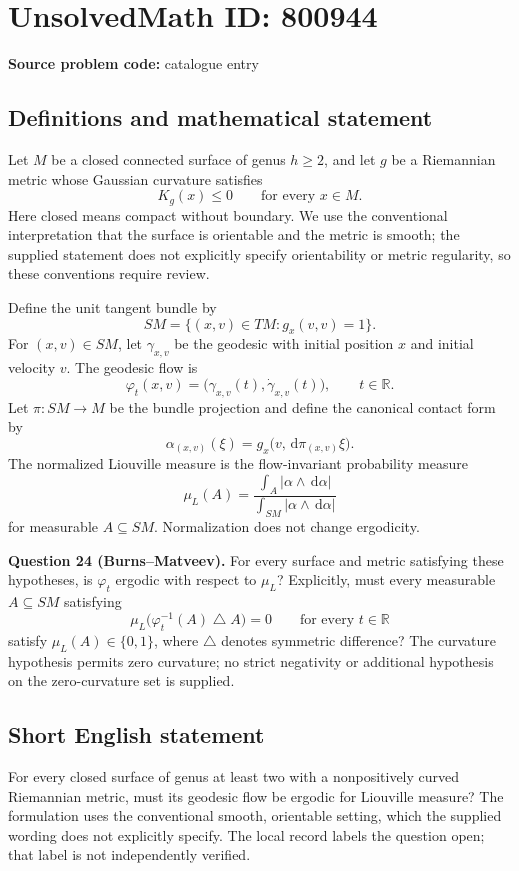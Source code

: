 \documentclass[11pt]{article}
\newcommand{\R}{\mathbb{R}}
\newcommand{\dd}{\,\mathrm{d}}
\begin{document}
\section*{UnsolvedMath ID: 800944}
\textbf{Source problem code:} catalogue entry
\subsection{Definitions and mathematical statement}
Let \(M\) be a closed connected surface of genus \(h\geq 2\), and let \(g\) be a Riemannian metric whose Gaussian curvature satisfies
\[
K_g(x)\leq 0\qquad\text{for every }x\in M.
\]
Here closed means compact without boundary. We use the conventional interpretation that the surface is orientable and the metric is smooth; the supplied statement does not explicitly specify orientability or metric regularity, so these conventions require review.

Define the unit tangent bundle by
\[
SM=\{(x,v)\in TM:g_x(v,v)=1\}.
\]
For \((x,v)\in SM\), let \(\gamma_{x,v}\) be the geodesic with initial position \(x\) and initial velocity \(v\). The geodesic flow is
\[
\varphi_t(x,v)=\bigl(\gamma_{x,v}(t),\dot\gamma_{x,v}(t)\bigr),\qquad t\in\R.
\]
Let \(\pi:SM\to M\) be the bundle projection and define the canonical contact form by
\[
\alpha_{(x,v)}(\xi)=g_x\bigl(v,\dd\pi_{(x,v)}\xi\bigr).
\]
The normalized Liouville measure is the flow-invariant probability measure
\[
\mu_L(A)=\frac{\displaystyle\int_A|\alpha\wedge\dd\alpha|}{\displaystyle\int_{SM}|\alpha\wedge\dd\alpha|}
\]
for measurable \(A\subseteq SM\). Normalization does not change ergodicity.

\textbf{Question 24 (Burns--Matveev).} For every surface and metric satisfying these hypotheses, is \(\varphi_t\) ergodic with respect to \(\mu_L\)? Explicitly, must every measurable \(A\subseteq SM\) satisfying
\[
\mu_L\bigl(\varphi_t^{-1}(A)\mathbin{\triangle}A\bigr)=0\qquad\text{for every }t\in\R
\]
satisfy \(\mu_L(A)\in\{0,1\}\), where \(\triangle\) denotes symmetric difference? The curvature hypothesis permits zero curvature; no strict negativity or additional hypothesis on the zero-curvature set is supplied.
\subsection{Short English statement}
For every closed surface of genus at least two with a nonpositively curved Riemannian metric, must its geodesic flow be ergodic for Liouville measure? The formulation uses the conventional smooth, orientable setting, which the supplied wording does not explicitly specify. The local record labels the question open; that label is not independently verified.
\end{document}
